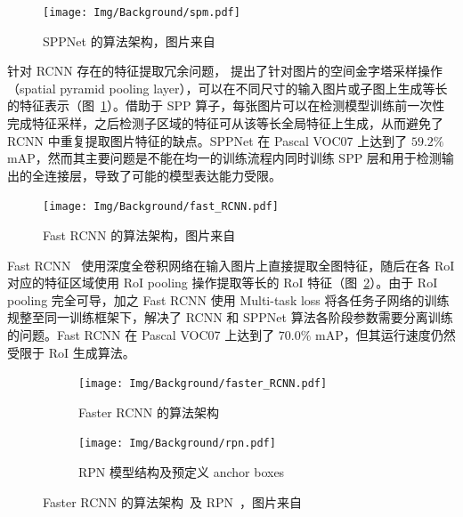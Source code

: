 \begin{figure}[htb]
  \centering
  \texttt{[image: Img/Background/spm.pdf]}
  \caption{SPPNet 的算法架构，图片来自~\citet{he2015spatial}}
  \label{img::background::SPPNet}
\end{figure}

针对 RCNN 存在的特征提取冗余问题，\citet{he2015spatial} 提出了针对图片的空间金字塔采样操作（spatial pyramid pooling layer），可以在不同尺寸的输入图片或子图上生成等长的特征表示（图~\ref{img::background::SPPNet}）。借助于 SPP 算子，每张图片可以在检测模型训练前一次性完成特征采样，之后检测子区域的特征可从该等长全局特征上生成，从而避免了 RCNN 中重复提取图片特征的缺点。SPPNet 在 Pascal VOC07 上达到了 $59.2\%$ mAP，然而其主要问题是不能在均一的训练流程内同时训练 SPP 层和用于检测输出的全连接层，导致了可能的模型表达能力受限。

\begin{figure}[htb]
  \centering
  \texttt{[image: Img/Background/fast\_RCNN.pdf]}
  \caption{Fast RCNN 的算法架构，图片来自~\citet{girshick2015fast}}
  \label{img::background::fast_RCNN}
\end{figure}

Fast RCNN~\citep{girshick2015fast} 使用深度全卷积网络在输入图片上直接提取全图特征，随后在各 RoI 对应的特征区域使用 RoI pooling 操作提取等长的 RoI 特征（图~\ref{img::background::fast_RCNN}）。由于 RoI pooling 完全可导，加之 Fast RCNN 使用 Multi-task loss 将各任务子网络的训练规整至同一训练框架下，解决了 RCNN 和 SPPNet 算法各阶段参数需要分离训练的问题。Fast RCNN 在 Pascal VOC07 上达到了 $70.0\%$ mAP，但其运行速度仍然受限于 RoI 生成算法。

\begin{figure}[htb]
  \centering
  \begin{subfigure}[t]{0.35\columnwidth}
    \centering
    \texttt{[image: Img/Background/faster\_RCNN.pdf]}
    \caption{Faster RCNN 的算法架构}
    \label{img::background::faster_rcnn_arch}
  \end{subfigure}
  \quad
  \begin{subfigure}[t]{0.6\columnwidth}
    \centering
    \texttt{[image: Img/Background/rpn.pdf]}
    \caption{RPN 模型结构及预定义 anchor boxes}
    \label{img::background::faster_rcnn_rpn}
  \end{subfigure}
  \caption{Faster RCNN 的算法架构~及 RPN~，图片来自~\citet{ren2015faster}}
  \label{img::background::faster_rcnn}
\end{figure}

